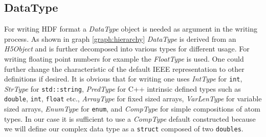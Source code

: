 \documentclass{article}
\begin{document}
\subsection{DataType}
For writing HDF format a \textit{DataType} object is needed as argument in the writing process. As shown in graph \ref{graph:hierarchy} \textit{DataType} is derived from an \textit{H5Object} and is further decomposed into various types for different usage. For writing floating point numbers for example the \textit{FloatType} is used. One could further change the characteristic of the default IEEE representation to other definitions if desired. It is obvious that for writing one uses \textit{IntType} for \texttt{int}, \textit{StrType} for \texttt{std::string}, \textit{PredType} for C++ intrinsic defined types such as \texttt{double}, \texttt{int}, \texttt{float} etc., \textit{ArrayType} for fixed sized arrays, \textit{VarLenType} for variable sized arrays, \textit{EnumType} for \texttt{enum}, and \textit{CompType} for simple compositions of atom types. In our case it is sufficient to use a \textit{CompType} default constructed because we will define our complex data type as a \texttt{struct} composed of two \texttt{doubles}.
\end{document}
